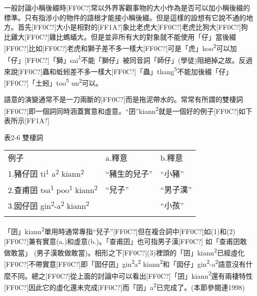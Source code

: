 \textrm{一般討論小稱後綴時[FF0C?]常以外界客觀事物的大小作為是否可以加小稱後綴的標準。只有指涉小的物件的語根才能接小稱後綴。但是這樣的設想有它說不通的地方。首先[FF0C?]大小是相對的[FF1A?]象比老虎大[FF0C?]老虎比狗大[FF0C?]狗比雞大[FF0C?]雞比螞蟻大。但是並非所有大的對象就不能使用「仔」當後綴[FF0C?]比如[FF0C?]老虎和獅子差不多一樣大[FF0C?]可是「虎」hoo}\textrm{\textsuperscript{2}}\textrm{可以加「仔」[FF0C?]「獅」sai}\textrm{\textsuperscript{1}}\textrm{不能「獅仔」被同音詞「師仔」(學徒)阻絕掉之故。反過來說[FF0C?]蟲和蚯蚓差不多一樣大[FF0C?]「蟲」thang}\textrm{\textsuperscript{5}}\textrm{不能加後綴「仔」[FF0C?]「土蚓」too}\textrm{\textsuperscript{5}} \textrm{un}\textrm{\textsuperscript{2}}\textrm{可以。}

\textrm{語意的演變通常不是一刀兩斷的[FF0C?]而是拖泥帶水的。常常有所謂的雙棲詞[FF0C?]即一個詞同時涵蓋實意和虛意。“囝”kiann}\textrm{\textsuperscript{2}}\textrm{就是一個好的例子[FF0C?]如下表所示[FF1A?]}

表2-6 雙棲詞

\tablefirsthead{}

\tabletail{}
\tablelasttail{}
\begin{tabularx}{\textwidth}{XXX}
\lsptoprule

 例子 & a.釋意 & b.釋意\\
{\sffamily \textrm{1.豬仔囝 ti}\textrm{\textsuperscript{1}} \textrm{a}\textrm{\textsuperscript{2}} \textrm{kiann}\textrm{\textsuperscript{2}}} & “豬生的兒子” & “小豬”\\
{\sffamily \textrm{2.查甫囝 tsa}\textrm{\textsuperscript{1} }\textrm{poo}\textrm{\textsuperscript{1}} \textrm{kiann}\textrm{\textsuperscript{2}}} & “兒子” & “男子漢”\\
{\sffamily \textrm{3.囡仔囝 gin}\textrm{\textsuperscript{2}}\textrm{{}-a}\textrm{\textsuperscript{2}} \textrm{kiann}\textrm{\textsuperscript{2}}} &  & “小孩”\\
\lspbottomrule
\end{tabularx}
\textrm{「囝」kiann}\textrm{\textsuperscript{2}}\textrm{單用時通常專指“兒子”}[FF0C?]\textrm{但在複合詞中[FF0C?]如(1)和(2)}[FF0C?]\textrm{兼有實意(a.)和虛意(b.)}。\textrm{「查甫囝」也可指男子漢[FF0C?] 如「查甫囝敢做敢當」 (男子漢敢做敢當)。相形之下[FF0C?](3)裡頭的「囝」kiann}\textrm{\textsuperscript{2}}\textrm{已經虛化[FF0C?]不帶實意[FF0C?]即「囡仔囝」gin}\textrm{\textsuperscript{2}}\textrm{a}\textrm{\textsuperscript{2}} \textrm{kiann}\textrm{\textsuperscript{2}}\textrm{和「囡仔」gin}\textrm{\textsuperscript{2}}\textrm{{}-a}\textrm{\textsuperscript{2}}\textrm{語意沒有什麼不同。總之[FF0C?]從上面的討論中可以看出[FF0C?]「囝」kiann}\textrm{\textsuperscript{2}}\textrm{還有兩棲特性[FF0C?]因此它的虛化還未完成[FF0C?]而「囝」a}\textrm{\textsuperscript{2}}\textrm{已完成了。(本節參閱連1998)}

